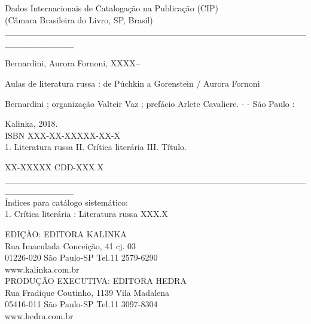 \begin{vplace}[1]
\begin{center}
Dados Internacionais de Catalogação na Publicação (CIP)\\
(Câmara Brasileira do Livro, SP, Brasil)\\
\_\_\_\_\_\_\_\_\_\_\_\_\_\_\_\_\_\_\_\_\_\_\_\_\_\_\_\_\_\_\_\_\_\_\_\_\_\_\_\_\_\_\_\_\_\_\_\_\_\_\_\_\_\_\_\_\_\_\_\\
\end{center}
\hspace{30pt}Bernardini, Aurora Fornoni, XXXX--


\hspace{35pt}Aulas de literatura russa : de Púchkin a Gorenstein / Aurora Fornoni

\hspace{12pt}Bernardini ; organização Valteir Vaz ; prefácio Arlete Cavaliere. - - São Paulo :

\hspace{12pt}Kalinka, 2018.\\[6pt]

\hspace{35pt}ISBN XXX-XX-XXXXX-XX-X\\[6pt]

\hspace{35pt}1. Literatura russa II. Crítica literária III. Título.

\begin{center}
\hspace{10pt}XX-XXXXX \hspace{180pt}CDD-XXX.X
\_\_\_\_\_\_\_\_\_\_\_\_\_\_\_\_\_\_\_\_\_\_\_\_\_\_\_\_\_\_\_\_\_\_\_\_\_\_\_\_\_\_\_\_\_\_\_\_\_\_\_\_\_\_\_\_\_\_\_\\
Índices para catálogo sistemático:\\[3pt]
1. Crítica literária : Literatura russa XXX.X\\
\end{center}
\end{vplace}

\begin{center}
EDIÇÃO: EDITORA KALINKA\\[7pt]
Rua Imaculada Conceição, 41 cj. 03\\[7pt]
01226-020 São Paulo-SP Tel.11 2579-6290\\[7pt]
www.kalinka.com.br\\[30pt]

PRODUÇÃO EXECUTIVA: EDITORA HEDRA\\[7pt]
Rua Fradique Coutinho, 1139 Vila Madalena\\[7pt]
05416-011 São Paulo-SP Tel.11 3097-8304\\[7pt]
www.hedra.com.br
\end{center}

